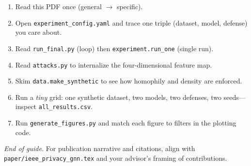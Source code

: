 \documentclass[11pt,a4paper]{article}
\begin{document}
\begin{enumerate}
  \item Read this PDF once (general $\rightarrow$ specific).
  \item Open \texttt{experiment\_config.yaml} and trace one triple (dataset, model, defense) you care about.
  \item Read \texttt{run\_final.py} (loop) then \texttt{experiment.run\_one} (single run).
  \item Read \texttt{attacks.py} to internalize the four-dimensional feature map.
  \item Skim \texttt{data.make\_synthetic} to see how homophily and density are enforced.
  \item Run a \emph{tiny} grid: one synthetic dataset, two models, two defenses, two seeds---inspect \texttt{all\_results.csv}.
  \item Run \texttt{generate\_figures.py} and match each figure to filters in the plotting code.
\end{enumerate}

\vspace{1em}
\noindent\textit{End of guide.} For publication narrative and citations, align with \texttt{paper/ieee\_privacy\_gnn.tex} and your advisor's framing of contributions.
\end{document}
